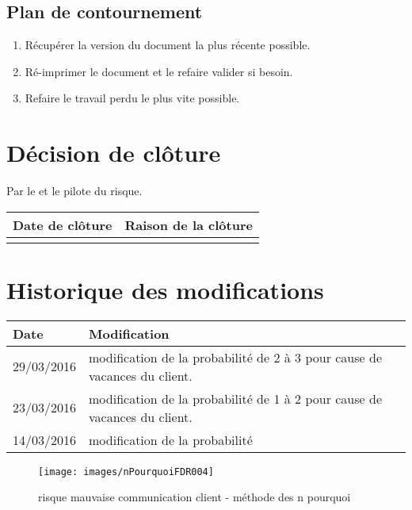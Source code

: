 \flushleft
\subsection*{Plan de contournement}

\begin{enumerate}
	\item Récupérer la version du document la plus récente possible.
	\item Ré-imprimer le document et le refaire valider si besoin.
	\item Refaire le travail perdu le plus vite possible.
\end{enumerate}

\section*{Décision de clôture}
Par le \CP{} et le pilote du risque.
\begin{table}[H]
\centering
	\begin{tabularx}{16.8cm}{|X|X|}
	\hline
	\rowcolor{gray!40} Date de clôture & Raison de la clôture \\
	\hline
	  & \\
	\hline
	\end{tabularx}
\end{table}

\section*{Historique des modifications}
\begin{table}[H]
\centering
	\begin{tabularx}{16.8cm}{|X|X|}
	\hline	
        \rowcolor{gray!40} Date & Modification \\
        
        \hline
	29/03/2016 & modification de la probabilité de 2 à 3 pour cause de vacances du client. \\
	\hline
	23/03/2016 & modification de la probabilité de 1 à 2 pour cause de vacances du client. \\
	\hline
	14/03/2016 & modification de la probabilité\\
	\hline
	\end{tabularx}
\end{table}
\newpage

\begin{figure}
	\centering
	\texttt{[image: images/nPourquoiFDR004]}
	\caption{\label{risque mauvaise communication client}risque mauvaise communication client - méthode des n pourquoi}
\end{figure}
